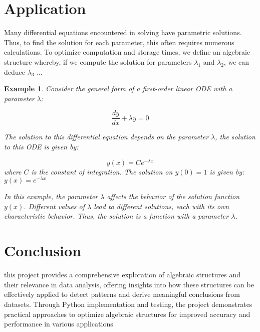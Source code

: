 \documentclass{article}
\newtheorem{Example}{Example}
\begin{document}
\section{Application}
Many differential equations encountered 
in solving have parametric solutions.
 Thus, to find the solution for each 
 parameter, this often requires 
 numerous calculations. To optimize 
 computation and storage times, we 
 define an algebraic structure 
 whereby, if we compute the solution 
 for parameters $\lambda_1$ and $ \lambda_2 $,
 we can deduce $\lambda_3$ ...
 \begin{Example}
    Consider the general form of a first-order linear ODE with a parameter $\lambda$:
    
    \[
    \frac{dy}{dx} + \lambda y = 0
    \]
    
    The solution to this differential 
    equation depends on the parameter
     $\lambda$, the solution to this ODE is given by:
    
    \[
    y(x) = C e^{-\lambda x}
    \]
    where $C$ is the constant of integration.
    The solution on $y(0)=1$ is given by:
    $y(x) = e^{-\lambda x}$
    






    In this example, the parameter $\lambda$ affects the behavior of the solution function $y(x)$. Different values of $\lambda$ lead to different solutions, each with its own characteristic behavior. Thus, the solution is a function with a parameter $\lambda$.
    \end{Example}

\section{Conclusion}
this project provides a comprehensive 
exploration of algebraic structures and
 their relevance in data analysis, 
 offering insights into how these 
 structures can be effectively applied 
 to detect patterns and derive meaningful
  conclusions from datasets. Through Python 
  implementation and testing, the project 
  demonstrates practical approaches to 
  optimize algebraic structures for 
  improved accuracy and performance 
  in various applications
    
\end{document}
